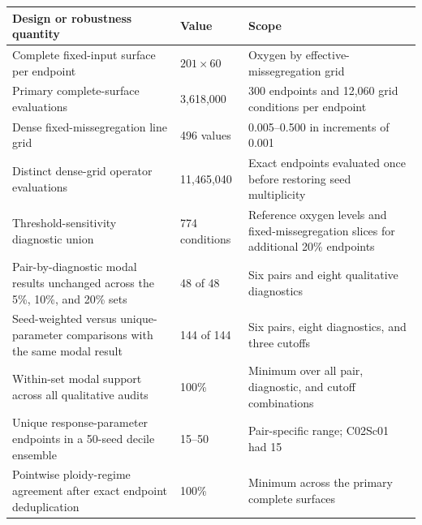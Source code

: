 \begin{table}[!htbp]
\vspace{0.8em}
\begin{tabular}{@{}p{}p{}p{}@{}}
\toprule
Design or robustness quantity & Value & Scope \\
\midrule
Complete fixed-input surface per endpoint & $201\times60$ & Oxygen by effective-missegregation grid \\
Primary complete-surface evaluations & 3,618,000 & 300 endpoints and 12,060 grid conditions per endpoint \\
Dense fixed-missegregation line grid & 496 values & 0.005--0.500 in increments of 0.001 \\
Distinct dense-grid operator evaluations & 11,465,040 & Exact endpoints evaluated once before restoring seed multiplicity \\
Threshold-sensitivity diagnostic union & 774 conditions & Reference oxygen levels and fixed-missegregation slices for additional 20\% endpoints \\
Pair-by-diagnostic modal results unchanged across the 5\%, 10\%, and 20\% sets & 48 of 48 & Six pairs and eight qualitative diagnostics \\
Seed-weighted versus unique-parameter comparisons with the same modal result & 144 of 144 & Six pairs, eight diagnostics, and three cutoffs \\
Within-set modal support across all qualitative audits & 100\% & Minimum over all pair, diagnostic, and cutoff combinations \\
Unique response-parameter endpoints in a 50-seed decile ensemble & 15--50 & Pair-specific range; C02Sc01 had 15 \\
Pointwise ploidy-regime agreement after exact endpoint deduplication & 100\% & Minimum across the primary complete surfaces \\
\bottomrule
\end{tabular}
\end{table}
